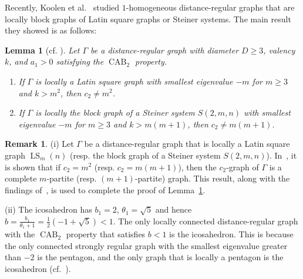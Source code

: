 \documentclass[11pt]{article}
\newtheorem{lemma}[theo]{Lemma}
\theoremstyle{definition}
\newtheorem{rema}[theo]{Remark}
\numberwithin{equation}{section}
\numberwithin{equation}{section}
\begin{document}
Recently, Koolen et al.~\cite{KLLLLT2023+} studied $1$-homogeneous distance-regular graphs that are locally block graphs of Latin square graphs or Steiner systems. 
The main result they showed is as follows:
\begin{lemma}[cf. {\cite[Theorem 1.2]{KLLLLT2023+}}]\label{lower bound of k}
Let $\Gamma$ be a distance-regular graph with diameter $D \geqslant 3$, valency $k$, and $a_1>0$ satisfying the $\operatorname{CAB}_2$ property.
\begin{enumerate}[\normalfont(i)]
  \item If $\Gamma$ is locally a Latin square graph with smallest eigenvalue $-m$ for $m \geqslant 3$ and $k > m^2$, then $c_2 \neq m^2$.
  \item If $\Gamma$ is locally the block graph of a Steiner system $S(2,m,n)$ with smallest eigenvalue $-m$ for $m \geqslant 3$ and $k >m(m+1)$, then $c_2 \neq m(m+1)$.
\end{enumerate}
\end{lemma} 

\begin{rema}
(i) Let $\Gamma$ be a distance-regular graph that is locally a Latin square graph $\operatorname{LS}_m(n)$ (resp. the block graph of a Steiner system $S(2,m,n)$). 
In~\cite{KLLLLT2023+}, it is shown that if $c_2=m^2$ (resp. $c_2=m(m+1)$), then the $c_2$-graph of $\Gamma$ is a complete $m$-partite (resp. $(m+1)$-partite) graph. 
This result, along with the findings of~\cite{JMT2010}, is used to complete the proof of Lemma~\ref{lower bound of k}.

(ii) The icosahedron has $b_1=2$, $\theta_1=\sqrt{5}$ and hence \mbox{$b = \frac{b_1}{\theta_1 +1} =\frac{1}{2}(-1+\sqrt{5})< 1$}.
The only locally connected distance-regular graph with the $\operatorname{CAB}_2$ property that satisfies $b  < 1$ is the icosahedron.
This is because the only connected strongly regular graph with the smallest eigenvalue greater than $-2$ is the pentagon, and the only graph that is locally a pentagon is the icosahedron (cf.~\cite[p.~35]{BCN}).
\end{rema}
\end{document}
